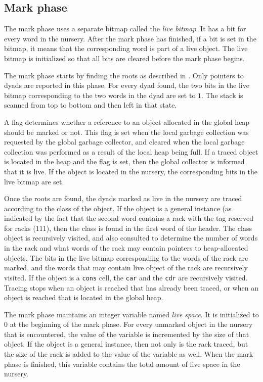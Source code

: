 \subsection{Mark phase}

The mark phase uses a separate bitmap called the \emph{live bitmap}.
It has a bit for every word in the nursery.  After the mark phase has
finished, if a bit is set in the bitmap, it means that the
corresponding word is part of a live object.  The live bitmap is
initialized so that all bits are cleared before the mark phase begins.

The mark phase starts by finding the roots as described in
.  Only pointers to dyads
are reported in this phase.  For every dyad found, the two bits in the
live bitmap corresponding to the two words in the dyad are set to $1$.
The stack is scanned from top to bottom and then left in that state.

A flag determines whether a reference to an object allocated in the
global heap should be marked or not.  This flag is set when the local
garbage collection was requested by the global garbage collector, and
cleared when the local garbage collection was performed as a result of
the local heap being full.  If a traced object is located in the heap
and the flag is set, then the global collector is informed that it is
live.  If the object is located in the nursery, the corresponding bits
in the live bitmap are set.

Once the roots are found, the dyads marked as live in the nursery are
traced according to the class of the object.  If the object is a
general instance (as indicated by the fact that the second word
contains a rack with the tag reserved for racks ($111$), then the
class is found in the first word of the header.  The class object is
recursively visited, and also consulted to determine the number of
words in the rack and what words of the rack may contain pointers to
heap-allocated objects.  The bits in the live bitmap corresponding to
the words of the rack are marked, and the words that may contain live
object of the rack are recursively visited.  If the object is a
\texttt{cons} cell, the \texttt{car} and the \texttt{cdr} are
recursively visited.  Tracing stops when an object is reached that has
already been traced, or when an object is reached that is located in
the global heap.

The mark phase maintains an integer variable named \emph{live space}.
It is initialized to $0$ at the beginning of the mark phase.  For
every unmarked object in the nursery that is encountered, the value of
the variable is incremented by the size of that object.  If the object
is a general instance, then not only is the rack traced, but the size
of the rack is added to the value of the variable as well.  When the
mark phase is finished, this variable contains the total amount of
live space in the nursery.

